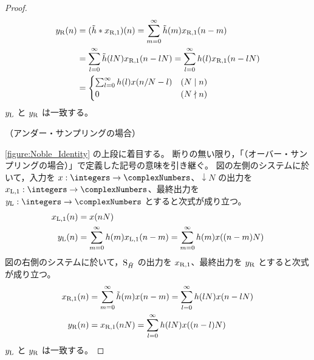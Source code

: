 \begin{proof}
\begin{align*}
                y_{\mathrm{R}}(n) &= (\tilde{h}*x_{\mathrm{R},1})(n) = \sum_{m=0}^\infty \tilde{h}(m)x_{\mathrm{R},1}(n-m) \\
                &= \sum_{l=0}^\infty \tilde{h}(lN)x_{\mathrm{R},1}(n-lN) = \sum_{l=0}^\infty h(l)x_{\mathrm{R},1}(n-lN) \\
                &= \begin{cases}
                    \sum_{l=0}^\infty h(l)x(n/N-l) & (N\mid n) \\
                    0 & (N\nmid n)
                \end{cases}
            \end{align*}
            $y_{\mathrm{L}}$ と $y_{\mathrm{R}}$ は一致する。
            \newline
            \quad\par\noindent
            （アンダー・サンプリングの場合）
            \par\noindent
            \cref{figure:Noble_Identity} の上段に着目する。
            断りの無い限り，「（オーバー・サンプリングの場合）」で定義した記号の意味を引き継ぐ。
            図の左側のシステムに於いて，入力を $x:\integers\to\complexNumbers$、$\downarrow N$ の出力を $\xLone:\integers\to\complexNumbers$、最終出力を $\yL:\integers\to\complexNumbers$ とすると次式が成り立つ。
            \begin{align*}
                x_{\mathrm{L},1}(n) &= x(nN) \\
                y_{\mathrm{L}}(n) &= \sum_{m=0}^\infty h(m)x_{\mathrm{L},1}(n-m) = \sum_{m=0}^\infty h(m)x((n-m)N)
            \end{align*}
            図の右側のシステムに於いて，$\mathrm{S}_{\tilde{H}}$ の出力を $x_{\mathrm{R},1}$、最終出力を $y_{\mathrm{R}}$ とすると次式が成り立つ。
            \begin{align*}
                x_{\mathrm{R},1}(n) &= \sum_{m=0}^\infty \tilde{h}(m)x(n-m) = \sum_{l=0}^\infty h(lN)x(n-lN) \\
                y_{\mathrm{R}}(n) &= x_{\mathrm{R},1}(nN) = \sum_{l=0}^\infty h(lN)x((n-l)N)
            \end{align*}
            $y_{\mathrm{L}}$ と $y_{\mathrm{R}}$ は一致する。
        \end{proof}
